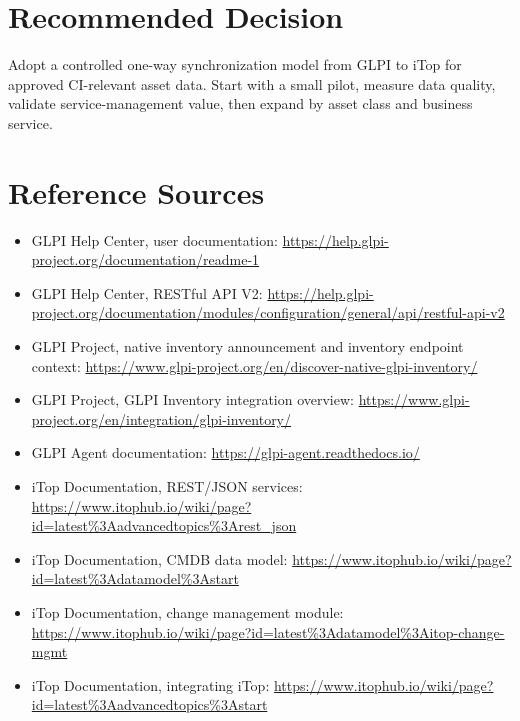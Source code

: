 \documentclass[11pt]{article}
\newcommand{\sourcesection}{%
\section*{Reference Sources}
\small
\begin{itemize}
  \item GLPI Help Center, user documentation: \url{https://help.glpi-project.org/documentation/readme-1}
  \item GLPI Help Center, RESTful API V2: \url{https://help.glpi-project.org/documentation/modules/configuration/general/api/restful-api-v2}
  \item GLPI Project, native inventory announcement and inventory endpoint context: \url{https://www.glpi-project.org/en/discover-native-glpi-inventory/}
  \item GLPI Project, GLPI Inventory integration overview: \url{https://www.glpi-project.org/en/integration/glpi-inventory/}
  \item GLPI Agent documentation: \url{https://glpi-agent.readthedocs.io/}
  \item iTop Documentation, REST/JSON services: \url{https://www.itophub.io/wiki/page?id=latest\%3Aadvancedtopics\%3Arest_json}
  \item iTop Documentation, CMDB data model: \url{https://www.itophub.io/wiki/page?id=latest\%3Adatamodel\%3Astart}
  \item iTop Documentation, change management module: \url{https://www.itophub.io/wiki/page?id=latest\%3Adatamodel\%3Aitop-change-mgmt}
  \item iTop Documentation, integrating iTop: \url{https://www.itophub.io/wiki/page?id=latest\%3Aadvancedtopics\%3Astart}
\end{itemize}
\normalsize
}
\begin{document}
\section{Recommended Decision}

\begin{calloutbox}
Adopt a controlled one-way synchronization model from GLPI to iTop for approved CI-relevant asset data. Start with a small pilot, measure data quality, validate service-management value, then expand by asset class and business service.
\end{calloutbox}

\sourcesection
\end{document}

